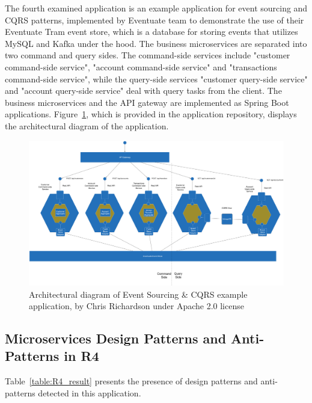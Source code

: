\documentclass{Configuration_Files/PoliMi3i_thesis}
\begin{document}
The fourth examined application is an example application for event sourcing and CQRS patterns, implemented by Eventuate\footnotemark[83] team to demonstrate the use of their Eventuate Tram event store, which is a database for storing events that utilizes MySQL and Kafka under the hood.
The business microservices are separated into two command and query sides.
The command-side services include "customer command-side service", "account command-side service" and "transactions command-side service", while the query-side services "customer query-side service" and "account query-side service" deal with query tasks from the client.
The business microservices and the API gateway are implemented as Spring Boot applications.
Figure~\ref{fig:R4_arch}, which is provided in the application repository, displays the architectural diagram of the application.

\begin{figure}[H]
\centering
\includegraphics[width=1\textwidth]{myImages/R4.png}
\caption{Architectural diagram of Event Sourcing \& CQRS example application, by Chris Richardson under Apache 2.0 license}
\label{fig:R4_arch}
\end{figure}

\subsection{Microservices Design Patterns and Anti-Patterns in R4}
\label{subsec:R4_detection}

Table~\ref{table:R4_result} presents the presence of design patterns and anti-patterns detected in this application.
\end{document}
